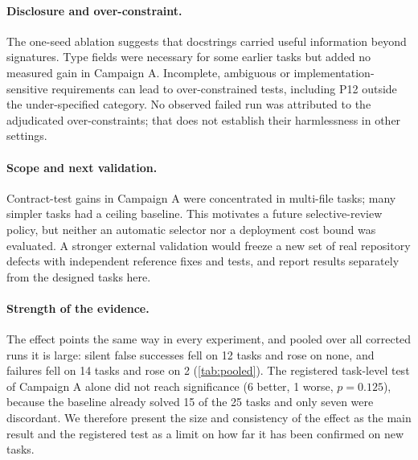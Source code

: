 \documentclass[11pt]{article}
\begin{document}
\paragraph{Disclosure and over-constraint.} The one-seed ablation suggests that docstrings carried useful information beyond signatures. Type fields were necessary for some earlier tasks but added no measured gain in Campaign A. Incomplete, ambiguous or implementation-sensitive requirements can lead to over-constrained tests, including P12 outside the under-specified category. No observed failed run was attributed to the adjudicated over-constraints; that does not establish their harmlessness in other settings.

\paragraph{Scope and next validation.} Contract-test gains in Campaign A were concentrated in multi-file tasks; many simpler tasks had a ceiling baseline. This motivates a future selective-review policy, but neither an automatic selector nor a deployment cost bound was evaluated. A stronger external validation would freeze a new set of real repository defects with independent reference fixes and tests, and report results separately from the designed tasks here.

\paragraph{Strength of the evidence.} The effect points the same way in every experiment, and pooled over all corrected runs it is large: silent false successes fell on 12 tasks and rose on none, and failures fell on 14 tasks and rose on 2 (\cref{tab:pooled}). The registered task-level test of Campaign A alone did not reach significance (6 better, 1 worse, $p=0.125$), because the baseline already solved 15 of the 25 tasks and only seven were discordant. We therefore present the size and consistency of the effect as the main result and the registered test as a limit on how far it has been confirmed on new tasks.

\end{document}
